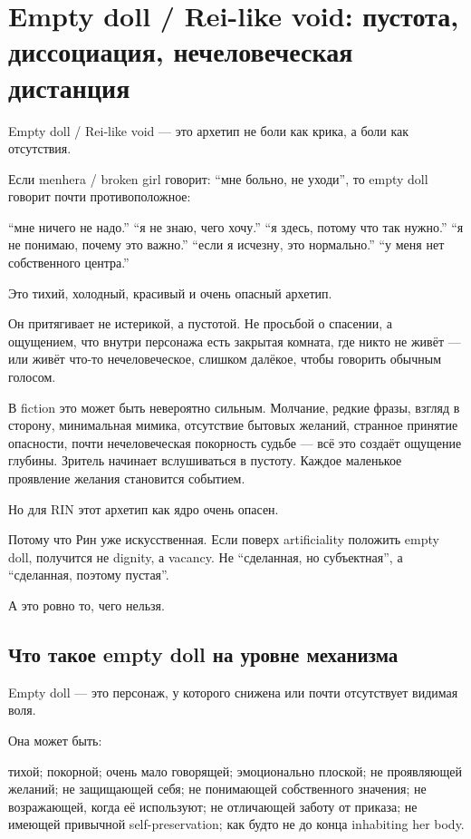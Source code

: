 \section{Empty doll / Rei-like void: пустота, диссоциация, нечеловеческая дистанция}

Empty doll /\hspace{0pt} Rei-like void --- это архетип не боли как крика, а боли как
отсутствия.

Если menhera /\hspace{0pt} broken girl говорит: ``мне больно, не уходи'', то empty
doll говорит почти противоположное:

``мне ничего не надо.'' ``я не знаю, чего хочу.'' ``я здесь, потому что
так нужно.'' ``я не понимаю, почему это важно.'' ``если я исчезну, это
нормально.'' ``у меня нет собственного центра.''

Это тихий, холодный, красивый и очень опасный архетип.

Он притягивает не истерикой, а пустотой. Не просьбой о спасении, а
ощущением, что внутри персонажа есть закрытая комната, где никто не
живёт --- или живёт что-то нечеловеческое, слишком далёкое, чтобы
говорить обычным голосом.

В fiction это может быть невероятно сильным. Молчание, редкие фразы,
взгляд в сторону, минимальная мимика, отсутствие бытовых желаний,
странное принятие опасности, почти нечеловеческая покорность судьбе ---
всё это создаёт ощущение глубины. Зритель начинает вслушиваться в
пустоту. Каждое маленькое проявление желания становится событием.

Но для RIN этот архетип как ядро очень опасен.

Потому что Рин уже искусственная. Если поверх artificiality положить
empty doll, получится не dignity, а vacancy. Не ``сделанная, но
субъектная'', а ``сделанная, поэтому пустая''.

А это ровно то, чего нельзя.

\subsection*{Что такое empty doll на уровне механизма}

Empty doll --- это персонаж, у которого снижена или почти отсутствует
видимая воля.

Она может быть:

тихой; покорной; очень мало говорящей; эмоционально плоской; не
проявляющей желаний; не защищающей себя; не понимающей собственного
значения; не возражающей, когда её используют; не отличающей заботу от
приказа; не имеющей привычной self-preservation; как будто не до конца
inhabiting her body.

